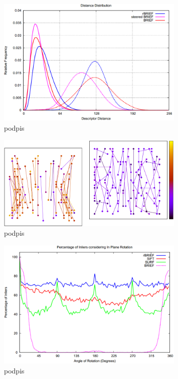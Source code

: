 \begin{figure}
\centering
\includegraphics[width=0.8\textwidth]{pict/02/orb/orb_wykres_5.png}
\caption{podpis}
\label{fig:orb_wykres_5}
\end{figure}



\begin{figure}
\centering
\includegraphics[width=0.8\textwidth]{pict/02/orb/orb_wykres_6.png}
\caption{podpis}
\label{fig:orb_wykres_6}
\end{figure}


\begin{figure}
\centering
\includegraphics[width=0.8\textwidth]{pict/02/orb/orb_wykres_7.png}
\caption{podpis}
\label{fig:orb_wykres_7}
\end{figure}


